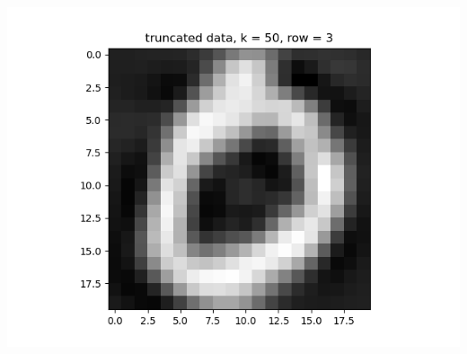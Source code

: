 \documentclass{article}
\begin{document}
\begin{enumerate}
\begin{enumerate}
\begin{center}
			\includegraphics[scale=.4]{hw3 trunc, k = 50, row = 3}
		\end{center}
		
		
		
	\end{enumerate}
	
	
	
\end{enumerate}
	
	
\end{document}
